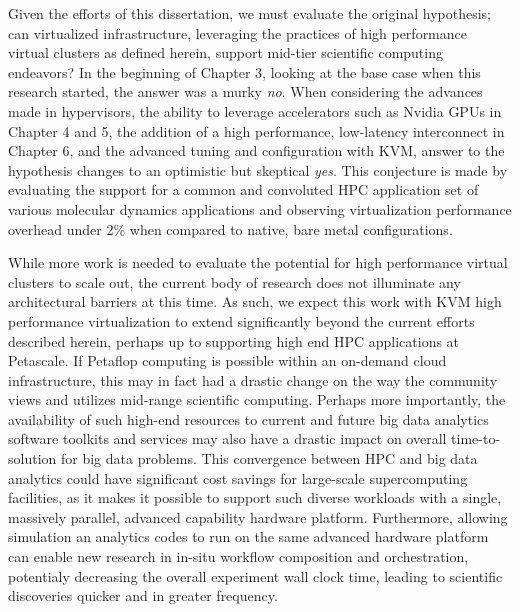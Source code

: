 Given the efforts of this dissertation, we must evaluate the original hypothesis; can virtualized infrastructure, leveraging the practices of high performance virtual clusters as defined herein, support mid-tier scientific computing endeavors? In the beginning of Chapter 3, looking at the base case when this research started, the answer was a murky \emph{no}.  When considering the advances made in hypervisors, the ability to leverage accelerators such as Nvidia GPUs in Chapter 4 and 5, the addition of a high performance, low-latency interconnect in Chapter 6, and the advanced tuning and configuration with KVM, answer to the hypothesis changes to an optimistic but skeptical \emph{yes}.  This conjecture is made by evaluating the support for a common and convoluted HPC application set of various molecular dynamics applications and observing virtualization performance overhead under 2\% when compared to native, bare metal configurations.  

While more work is needed to evaluate the potential for high performance virtual clusters to scale out, the current body of research does not illuminate any architectural barriers at this time.  As such, we expect this work with KVM high performance virtualization to extend significantly beyond the current efforts described herein, perhaps up to supporting high end HPC applications at Petascale.  If Petaflop computing is possible within an on-demand cloud infrastructure, this may in fact had a drastic change on the way the community views and utilizes mid-range scientific computing. Perhaps more importantly, the availability of such high-end resources to current and future big data analytics software toolkits and services may also have a drastic impact on overall time-to-solution for big data problems. This convergence between HPC and big data analytics could have significant cost savings for large-scale supercomputing facilities, as it makes it possible to support such diverse workloads with a single, massively parallel, advanced capability hardware platform.  Furthermore, allowing simulation an analytics codes to run on the same advanced hardware platform can enable new research in in-situ workflow composition and orchestration, potentialy decreasing the overall experiment wall clock time, leading to scientific discoveries quicker and in greater frequency.





